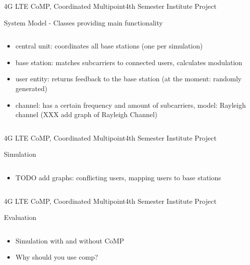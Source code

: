 \documentclass[xcolor={cmyk}]{beamer}
\begin{document}
 
  \begin{frame}{4G LTE CoMP, Coordinated Multipoint}{4th Semester Institute Project}
	 \begin{block}{System Model - Classes providing main functionality}
	 	\begin{columns}
			\begin{column}{.9\textwidth}
				\begin{itemize}
					\item central unit: coordinates all base stations (one per simulation)
					\item base station: matches subcarriers to connected users, calculates modulation
					\item user entity: returns feedback to the base station (at the moment: randomly generated)
					\item channel: has a certain frequency and amount of subcarriers, model: Rayleigh channel (XXX add graph of Rayleigh Channel)
				\end{itemize}
			\end{column}
		\end{columns}
	 \end{block}
 \end{frame}


 \begin{frame}{4G LTE CoMP, Coordinated Multipoint}{4th Semester Institute Project}
	 \begin{block}{Simulation}
	 	\begin{columns}
			\begin{column}{.9\textwidth}
				\begin{itemize}
					\item TODO add graphs: conflicting users, mapping users to base stations
				\end{itemize}
			\end{column}
		\end{columns}
	 \end{block}
 \end{frame}
 
 \begin{frame}{4G LTE CoMP, Coordinated Multipoint}{4th Semester Institute Project}
	 \begin{block}{Evaluation}
	 	\begin{columns}
			\begin{column}{.9\textwidth}
				\begin{itemize}
					\item Simulation with and without CoMP
					\item Why should you use comp?
				\end{itemize}
			\end{column}
		\end{columns}
	 \end{block}
 \end{frame}
 
\end{document}

